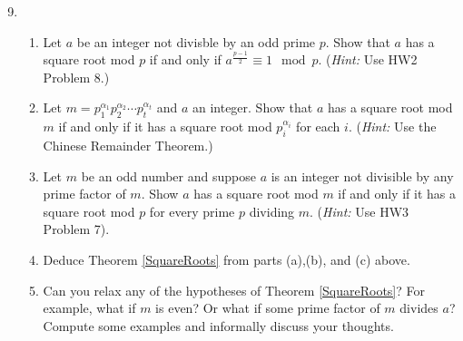 \documentclass[11pt]{article}
\begin{document}
\begin{enumerate}
  \setcounter{enumi}{8}
  \item{
  \begin{enumerate}
    \item{
    Let $a$ be an integer not divisble by an odd prime $p$.  Show that $a$ has a square root mod $p$ if and only if $a^{\frac{p-1}{2}}\equiv 1\mod p$. (\textit{Hint:} Use HW2 Problem 8.)
    }
    \item{
    Let $m = p_1^{\alpha_1}p_2^{\alpha_2}\cdots p_t^{\alpha_t}$ and $a$ an integer.  Show that $a$ has a square root mod $m$ if and only if it has a square root mod $p_i^{\alpha_i}$ for each $i$. (\textit{Hint:} Use the Chinese Remainder Theorem.)
    }
    \item{
    Let $m$ be an odd number and suppose $a$ is an integer not divisible by any prime factor of $m$.  Show $a$ has a square root mod $m$ if and only if it has a square root mod $p$ for every prime $p$ dividing $m$. (\textit{Hint:} Use HW3 Problem 7).
    }
    \item{
    Deduce Theorem \ref{SquareRoots} from parts (a),(b), and (c) above.
    }
    \item{
    Can you relax any of the hypotheses of Theorem \ref{SquareRoots}?  For example, what if $m$ is even?  Or what if some prime factor of $m$ divides $a$?  Compute some examples and informally discuss your thoughts.
    }
  \end{enumerate}
  }
\end{enumerate}
\end{document}
